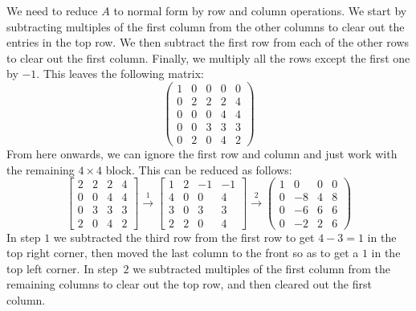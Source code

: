 \documentclass{amsart}
\newcommand{\bbm}       {\left[\begin{matrix}}
\newcommand{\ebm}       {\end{matrix}\right]}
\newcommand{\tm}        {\times}
\newcommand{\xra}       {\xrightarrow}
\renewcommand{\:}{\colon}
\theoremstyle{definition}
\renewenvironment{solution}{\SolutionAtEnd}{\endSolutionAtEnd}
\begin{document}
\begin{solution}
 We need to reduce $A$ to normal form by row and column operations.
 We start by subtracting multiples of the first column from the other
 columns to clear out the entries in the top row.  We then subtract
 the first row from each of the other rows to clear out the first
 column.  Finally, we multiply all the rows except the first one by
 $-1$.  This leaves the following matrix:
 \[ \left( \begin{array}{c|cccc}
             1 &  0 &  0 &  0 &  0 \\ \hline
             0 &  2 &  2 &  2 &  4 \\
             0 &  0 &  0 &  4 &  4 \\
             0 &  0 &  3 &  3 &  3 \\
             0 &  2 &  0 &  4 &  2 \end{array}\right)
 \]
 From here onwards, we can ignore the first row and column and just
 work with the remaining $4\tm 4$ block.  This can be reduced as
 follows: 
 \[ \bbm  2 &  2 &  2 &  4 \\
          0 &  0 &  4 &  4 \\
          0 &  3 &  3 &  3 \\
          2 &  0 &  4 &  2 \ebm \xra{1}
    \bbm  1 &  2 & -1 & -1 \\
          4 &  0 &  0 &  4 \\
          3 &  0 &  3 &  3 \\
          2 &  2 &  0 &  4 \ebm \xra{2}
    \left(\begin{array}{c|ccc}
          1 &  0 &  0 &  0 \\\hline
          0 & -8 &  4 &  8 \\
          0 & -6 &  6 &  6 \\
          0 & -2 &  2 &  6 \end{array}\right)
 \]
 In step $1$ we subtracted the third row from the first row to get
 $4-3=1$ in the top right corner, then moved the last column to the
 front so as to get a $1$ in the top left corner.  In step~$2$ we
 subtracted multiples of the first column from the remaining columns
 to clear out the top row, and then cleared out the first column.


\end{solution}
\end{document}
